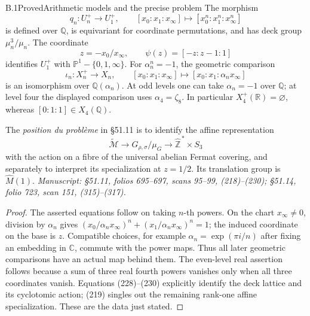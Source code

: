 \begin{statement}{B.1}{Proved}{Arithmetic models and the precise problem}
The morphism
\[
 q_n:U_n^+\longrightarrow U_1^+,\qquad
 [x_0:x_1:x_\infty]\longmapsto[x_0^n:x_1^n:x_\infty^n]
\]
is defined over \(\mathbb Q\), is equivariant for coordinate permutations,
and has deck group \(\mu_n^3/\mu_n\). The coordinate
\[
 z=-x_0/x_\infty,\qquad
 \psi(z)=[-z:z-1:1]
\]
identifies \(U_1^+\) with \(\mathbb P^1-\{0,1,\infty\}\).
For \(\alpha_n^n=-1\), the geometric comparison
\[
 \iota_n:X_n^+\longrightarrow X_n,\qquad
 [x_0:x_1:x_\infty]\longmapsto[x_0:x_1:\alpha_n x_\infty]
\]
is an isomorphism over \(\mathbb Q(\alpha_n)\).
At odd levels one can take \(\alpha_n=-1\) over \(\mathbb Q\);
at level four the displayed comparison uses \(\alpha_4=\zeta_8\).
In particular \(X_4^+(\mathbb R)=\varnothing\), whereas
\([0:1:1]\in X_4(\mathbb Q)\).

The \emph{position du probl\`eme} in \S51.11 is to identify the affine
representation
\[
 \widetilde{\mathcal M}\longrightarrow
 G_{\rho,\sigma}/\mu_G
 \longrightarrow \widehat{\mathbb Z}^{\,*}\times S_3
\]
with the action on a fibre of the universal abelian Fermat covering,
and separately to interpret its specialization at \(z=1/2\).
Its translation group is \(\widehat M(1)\).
\emph{Manuscript: \S51.11, folios 695--697, scans 95--99, (218)--(230);
\S51.14, folio 723, scan 151, (315)--(317).}
\end{statement}
\begin{proof}
The asserted equations follow on taking \(n\)-th powers. On the chart
\(x_\infty\ne0\), division by \(\alpha_n\) gives
\((x_0/\alpha_nx_\infty)^n+(x_1/\alpha_nx_\infty)^n=1\);
the induced coordinate on the base is \(z\). Compatible choices, for
example \(\alpha_n=\exp(\pi i/n)\) after fixing an embedding in
\(\mathbb C\), commute with the power maps. Thus all later geometric
comparisons have an actual map behind them. The even-level real assertion
follows because a sum of three real fourth powers vanishes only when
all three coordinates vanish. Equations (228)--(230) explicitly identify
the deck lattice and its cyclotomic action; (219) singles out the remaining
rank-one affine specialization. These are the data just stated.
\end{proof}

